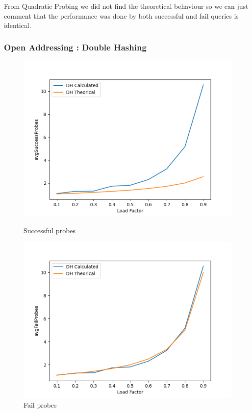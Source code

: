 \documentclass{article}
\begin{document}
    From Quadratic Probing we did not find the theoretical behaviour so we can just comment that the performance was done by both successful and fail queries is identical. 
    
    \subsubsection*{Open Addressing : Double Hashing}

        \begin{figure}[!h]
          \includegraphics[width=\linewidth]{images/loadFactor_vs_avgSuccessProbes_DH.png}
          \caption{Successful probes}\label{fig:plot8}
        \endminipage\hfill
          \includegraphics[width=\linewidth]{images/loadFactor_vs_avgFailProbes_DH.png}
          \caption{Fail probes}\label{fig:plot9}
        \endminipage
    \end{figure}
    
\end{document}

